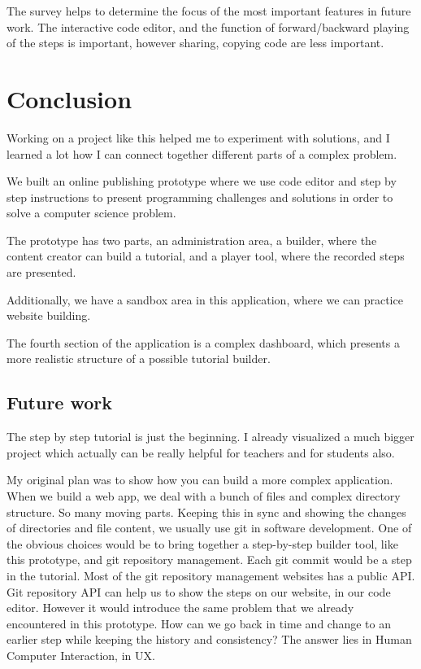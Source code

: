 \documentclass[11pt, a4paper, oneside, openright, medskipamount]{report}
\begin{document}
The survey helps to determine the focus of the most important features in future work. The interactive code editor, and the function of forward/backward playing of the steps is important, however sharing, copying code are less important.

\section{Conclusion}

Working on a project like this helped me to experiment with solutions, and I learned a lot how I can connect together different parts of a complex problem.

We built an online publishing prototype where we use code editor and step by step instructions to present programming challenges and solutions in order to solve a computer science problem.

The prototype has two parts, an administration area, a builder, where the content creator can build a tutorial, and a player tool, where the recorded steps are presented.

Additionally, we have a sandbox area in this application, where we can practice website building.

The fourth section of the application is a complex dashboard, which presents a more realistic structure of a possible tutorial builder.

\subsection{Future work}

The step by step tutorial is just the beginning. I already visualized a much bigger project which actually can be really helpful for teachers and for students also.

My original plan was to show how you can build a more complex application. When we build a web app, we deal with a bunch of files and complex directory structure. So many moving parts. Keeping this in sync and showing the changes of directories and file content, we usually use git in software development. One of the obvious choices would be to bring together a step-by-step builder tool, like this prototype, and git repository management. Each git commit would be a step in the tutorial. Most of the git repository management websites has a public API. Git repository API can help us to show the steps on our website, in our code editor. However it would introduce the same problem that we already encountered in this prototype. How can we go back in time and change to an earlier step while keeping the history and consistency? The answer lies in Human Computer Interaction, in UX.
\end{document}
